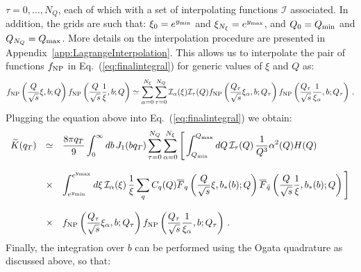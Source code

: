 \documentclass[10pt,a4paper]{article}
\begin{document}
$\tau=0,\dots,N_Q$, each of which with a set of interpolating
functions $\mathcal{I}$ associated. In addition, the grids are such
that: $\xi_0 = e^{y_{\rm min}}$ and $\xi_{N_\xi} = e^{y_{\rm max}}$,
and $Q_0 = Q_{\rm min}$ and $Q_{N_Q} = Q_{\rm max}$. More details on
the interpolation procedure are presented in
Appendix~\ref{app:LagrangeInterpolation}. This allows us to interpolate
the pair of functions $f_{\rm NP}$ in Eq.~(\ref{eq:finalintegral}) for
generic values of $\xi$ and $Q$ as:
\begin{equation}\label{eq:interpolation}
f_{\rm NP}\left(\frac{Q}{\sqrt{s}}\xi,b;Q\right) f_{\rm NP}\left(\frac{Q}{\sqrt{s}}\frac1{\xi},b;Q\right) \simeq \sum_{\alpha=0}^{N_\xi}\sum_{\tau=0}^{N_Q}\mathcal{I}_\alpha(\xi)\mathcal{I}_\tau(Q) f_{\rm NP}\left(\frac{Q_\tau}{\sqrt{s}}\xi_\alpha,b;Q_\tau\right) f_{\rm NP}\left(\frac{Q_\tau}{\sqrt{s}}\frac1{\xi_\alpha},b;Q_\tau\right)\,.
\end{equation}
Plugging the equation above into Eq.~(\ref{eq:finalintegral}) we
obtain:
\begin{equation}
\begin{array}{rcl}
\displaystyle  \widetilde{K}(q_T) &\simeq& \displaystyle \frac{8\pi q_T}{9} \int_0^\infty db\, J_1(bq_T)
  \sum_{\tau=0}^{N_Q}\sum_{\alpha=0}^{N_\xi}\Bigg[\int_{Q_{\rm min}}^{Q_{\rm max}}dQ\,\mathcal{I}_\tau(Q)\, 
  \frac{1}{Q^3} \alpha^2(Q) H(Q) 
  \\
\\
&\times& \displaystyle 
                         \int_{e^{y_{\rm
    min}}}^{e^{y_{\rm max}}}d\xi\,\mathcal{I}_\alpha(\xi)\,\frac{1}{\xi} \sum_q C_q(Q)\overline{F}_q\left(\frac{Q}{\sqrt{s}}\xi,b_*(b);Q\right)
                         \overline{F}_{\bar{q}}\left(\frac{Q}{\sqrt{s}}\frac1{\xi},b_*(b);Q\right)\Bigg] \\
\\
&\times& \displaystyle f_{\rm NP}\left(\frac{Q_\tau}{\sqrt{s}}\xi_\alpha,b;Q_\tau\right) f_{\rm NP}\left(\frac{Q_\tau}{\sqrt{s}}\frac1{\xi_\alpha},b;Q_\tau\right)\,.
\end{array}
\end{equation}
Finally, the integration over $b$ can be performed using the Ogata
quadrature as discussed above, so that:
\end{document}
